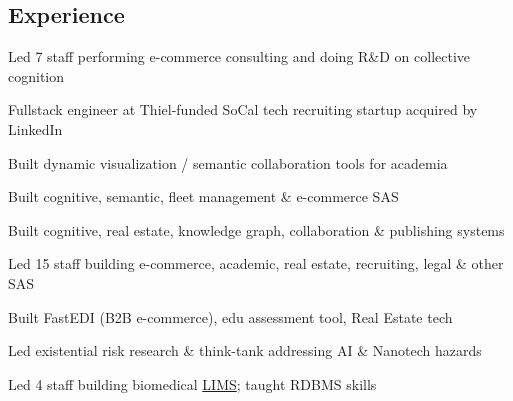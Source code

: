 \documentclass[line,margin,hidelinks]{res}
\begin{document}
\begin{resume}

\section{Experience}


\begin{position}
Led 7 staff performing e-commerce consulting and doing R\&D on collective cognition
\end{position}

\parskip=3.5pt %


\begin{position}
Fullstack engineer at Thiel-funded SoCal tech recruiting startup acquired by LinkedIn
\end{position}


\begin{position}
Built dynamic visualization / semantic collaboration tools for academia
\end{position}


\begin{position}
Built cognitive, semantic, fleet management \& e-commerce SAS
\end{position}


\begin{position}
Built cognitive, real estate, knowledge graph, collaboration \& publishing systems
\end{position}


\begin{position}
Led 15 staff building e-commerce, academic, real estate, recruiting, legal \& other SAS
\end{position}


\begin{position}
Built FastEDI (B2B e-commerce),
edu assessment tool,
Real Estate tech
\end{position}


\begin{position}
Led existential risk research \& think-tank addressing AI \& Nanotech hazards
\end{position}


\begin{position}
Led 4 staff building biomedical
\href{https://en.wikipedia.org/wiki/Laboratory_information_management_system}{LIMS};
taught RDBMS skills
\end{position}


\end{resume}
\end{document}
